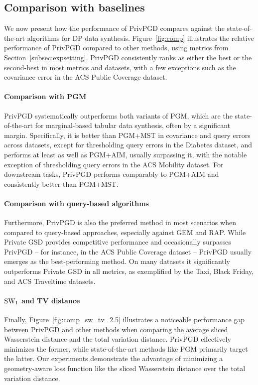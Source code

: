   \subsection{Comparison with baselines}
\label{sec:exp_priv_marginals}


We now present how the performance of PrivPGD compares against the state-of-the-art algorithms for DP data synthesis. Figure~\ref{fig:comp} illustrates the relative performance of PrivPGD compared to other methods, using metrics from Section~\ref{subsec:expsetting}. PrivPGD consistently ranks as either the best or the second-best in most metrics and datasets, with a few exceptions such as the covariance error in the ACS Public Coverage dataset.

\paragraph{Comparison with PGM}
PrivPGD systematically outperforms both variants of PGM, which are the state-of-the-art for marginal-based tabular data synthesis, often by a significant margin. Specifically, it is better than PGM+MST in covariance and query errors across datasets, except for thresholding query errors in the Diabetes dataset, and performs at least as well as PGM+AIM, usually surpassing it, with the notable exception of thresholding query errors in the ACS Mobility dataset. For downstream tasks, PrivPGD performs comparably to PGM+AIM and consistently better than PGM+MST.


\paragraph{Comparison with query-based algorithms}
Furthermore, PrivPGD is also the preferred method in most scenarios when compared to query-based approaches, especially against GEM and RAP. While Private GSD provides competitive performance and occasionally surpasses PrivPGD – for instance, in the ACS Public Coverage dataset – PrivPGD usually emerges as the best-performing method. On many datasets it significantly outperforms Private GSD in all metrics, as exemplified by the Taxi, Black Friday, and ACS Traveltime datasets.


\paragraph{$\text{SW}_1$ and TV distance} Finally, Figure~\ref{fig:comp_sw_tv_2.5} illustrates a noticeable performance gap between PrivPGD and other methods when comparing the average sliced Wasserstein distance and the total variation distance. PrivPGD effectively minimizes the former, while state-of-the-art methods like PGM primarily target the latter. Our experiments demonstrate the advantage of minimizing a geometry-aware loss function like the sliced Wasserstein distance over the total variation distance.




